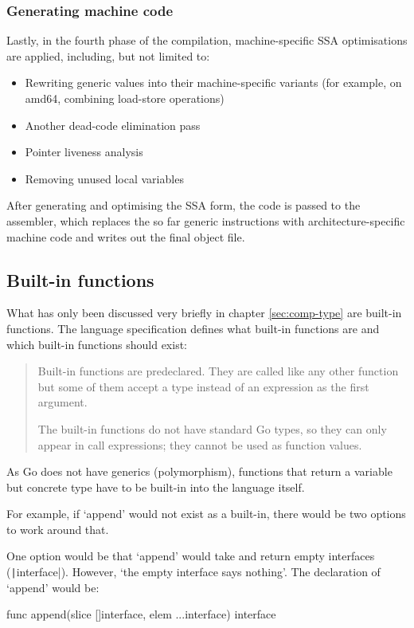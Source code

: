 \subsubsection{Generating machine code}

Lastly, in the fourth phase of the compilation, machine-specific
SSA optimisations are applied, including, but not limited to:
\begin{itemize}
    \item Rewriting generic values into their machine-specific variants
        (for example, on amd64, combining load-store operations)
    \item Another dead-code elimination pass
    \item Pointer liveness analysis
    \item Removing unused local variables
\end{itemize}

After generating and optimising the SSA form, the code is passed to the
assembler, which replaces the so far generic instructions with
architecture-specific machine code and writes out the final object file.
\autocite{compiler-readme}

\subsection{Built-in functions}

What has only been discussed very briefly in chapter \ref{sec:comp-type} are
built-in functions. The language specification defines what built-in functions
are and which built-in functions should exist:
\begin{quote}
    Built-in functions are predeclared. They are called like any other function
    but some of them accept a type instead of an expression as the first argument.

    The built-in functions do not have standard Go types, so they can only appear
    in call expressions; they cannot be used as function values.\autocite{go-spec-builtins}
\end{quote}

As Go does not have generics (polymorphism), functions that return a variable but
concrete type have to be built-in into the language itself.

For example, if `append' would not exist as a built-in, there would be two options
to work around that.

One option would be that `append' would take and return empty interfaces
(\texttt|interface{}|). However, `the empty interface says
nothing'\autocite{empty-interface}. The declaration of `append' would be:
\begin{gocode}
  func append(slice []interface{}, elem ...interface{}) {}interface
\end{gocode}

